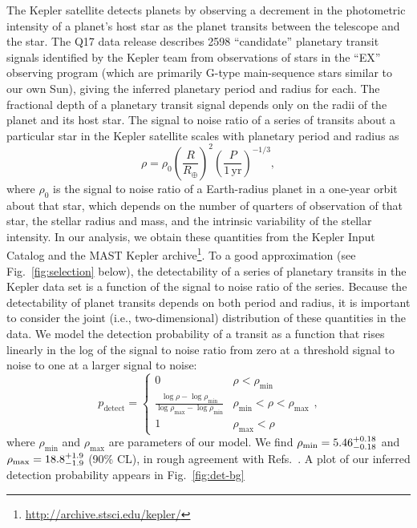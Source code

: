 \documentclass{nature}
\newcommand{\REarth}{R_\oplus}
\newcommand{\rhomin}{\rho_\mathrm{min}}
\newcommand{\rhomax}{\rho_\mathrm{max}}
\begin{document}
The Kepler satellite detects planets by observing a decrement in the
photometric intensity of a planet's host star as the planet transits
between the telescope and the star.  The Q17 data release describes
2598 ``candidate'' planetary transit signals identified by the Kepler
team from observations of stars in the ``EX'' observing program (which
are primarily G-type main-sequence stars similar to our own
Sun\cite{Batalha2010}), giving the inferred planetary period and
radius for each.  The fractional depth of a planetary transit signal
depends only on the radii of the planet and its host star.  The signal
to noise ratio of a series of transits about a particular star in the
Kepler satellite scales with planetary period and radius
as\cite{Chatterjee2012}
\begin{equation}
  \rho = \rho_0 \left( \frac{R}{\REarth} \right)^2 \left(
  \frac{P}{1\,\mathrm{yr}} \right)^{-1/3},
\end{equation}
where $\rho_0$ is the signal to noise ratio of a Earth-radius planet
in a one-year orbit about that star, which depends on the number of
quarters of observation of that star, the stellar radius and mass, and
the intrinsic variability of the stellar
intensity\cite{Christiansen2012}.  In our analysis, we obtain these
quantities from the Kepler Input Catalog\cite{Batalha2010,Brown2011}
and the MAST Kepler
archive\footnote{\url{http://archive.stsci.edu/kepler/}}.  To a good
approximation (see Fig.\ \ref{fig:selection} below), the detectability
of a series of planetary transits in the Kepler data set is a function
of the signal to noise ratio of the series.  Because the detectability
of planet transits depends on both period and radius, it is important
to consider the joint (i.e., two-dimensional) distribution of these
quantities in the data\cite{Tabachnik2002,Youdin2011}.  We model the
detection probability of a transit as a function that rises linearly
in the log of the signal to noise ratio from zero at a threshold
signal to noise to one at a larger signal to noise:
\begin{equation}
  \label{eq:pdetect}
  p_\mathrm{detect} = \begin{cases}
    0 & \rho < \rhomin \\
    \frac{\log \rho - \log \rhomin}{\log \rhomax - \log \rhomin} &
    \rhomin < \rho < \rhomax \\
    1 & \rhomax < \rho
  \end{cases},
\end{equation}
where $\rhomin$ and $\rhomax$ are parameters of our model.  We find
$\rhomin = \rhominrange$ and $\rhomax = \rhomaxrange$ (90\% CL), in
rough agreement with Refs.\ \cite{Borucki2011,Batalha2013}.  A plot of
our inferred detection probability appears in Fig.\ \ref{fig:det-bg}
\end{document}
